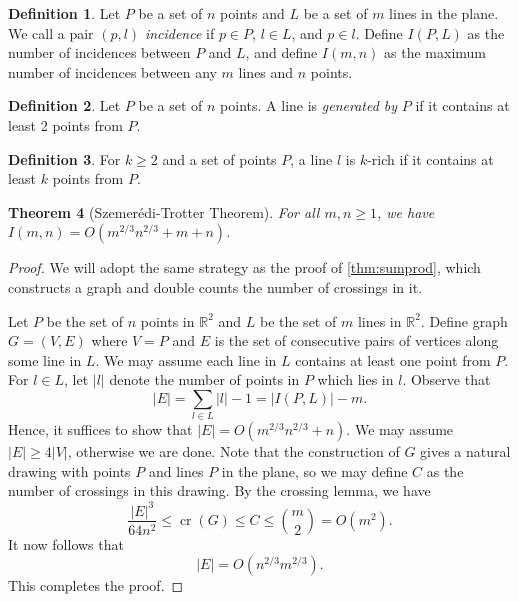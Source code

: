\documentclass[10pt,reqno]{amsart}
\newtheorem{theorem}{Theorem}[section]
\theoremstyle{definition}
\newtheorem{definition}[theorem]{Definition}
\theoremstyle{remark}
\renewcommand{\leq}{\leqslant}
\renewcommand{\geq}{\geqslant}
\def\R{\mathbb{R}}
\def\cr{\operatorname{cr}}
\numberwithin{equation}{section}
\begin{document}
\begin{definition}
	Let $P$ be a set of $n$ points and $L$ be a set of $m$ lines in the plane. We call a pair $(p, l)$ \textit{incidence} if $p \in P$, $l \in L$, and $p \in l$. Define $I(P, L)$ as the number of incidences between $P$ and $L$, and define $I(m, n)$ as the maximum number of incidences between any $m$ lines and $n$ points.
\end{definition}

\begin{definition}
	Let $P$ be a set of $n$ points. A line is \textit{generated by} $P$ if it contains at least 2 points from $P$.
\end{definition}

\begin{definition}
	For $k \geq 2$ and a set of points $P$, a line $l$ is $k$-rich if it contains at least $k$ points from $P$.
\end{definition}

\begin{theorem}[Szemerédi-Trotter Theorem]\label{thm:szemeredi-trotter}
	For all $m, n \geq 1$, we have $I(m, n) = O(m^{2/3}n^{2/3} + m + n)$.
\end{theorem}

\begin{proof}
	We will adopt the same strategy as the proof of \cref{thm:sumprod}, which constructs a graph and double counts the number of crossings in it.

	Let $P$ be the set of $n$ points in $\R^2$ and $L$ be the set of $m$ lines in $\R^2$.	Define graph $G = (V, E)$ where $V = P$ and $E$ is the set of consecutive pairs of vertices along some line in $L$. We may assume each line in $L$ contains at least one point from $P$. For $l \in L$, let $|l|$ denote the number of points in $P$ which lies in $l$. Observe that
	\[
		|E| = \sum_{l \in L} |l| - 1 = |I(P, L)| - m.
	\]
	Hence, it suffices to show that $|E| = O(m^{2/3}n^{2/3} + n)$. We may assume $|E| \geq 4|V|$, otherwise we are done. Note that the construction of $G$ gives a natural drawing with points $P$ and lines $P$ in the plane, so we may define $C$ as the number of crossings in this drawing. By the crossing lemma, we have
	\[
		\frac{|E|^3}{64n^2} \leq \cr(G) \leq C \leq \binom{m}{2} = O(m^2).
	\]
	It now follows that
	\[
		|E| = O(n^{2/3}m^{2/3}).
	\]
	This completes the proof.
\end{proof}

\end{document}
